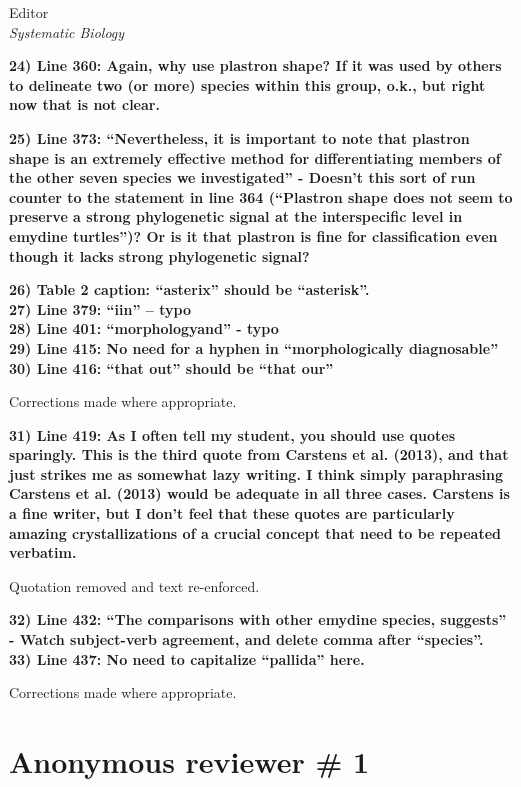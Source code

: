 \documentclass{letter}
\begin{document}
\begin{letter}{Editor \\ \textit{Systematic Biology}}

  \textbf{24) Line 360: Again, why use plastron shape? If it was used by others to delineate two (or more) species within this group, o.k., but right now that is not clear. }


  \textbf{25) Line 373: ``Nevertheless, it is important to note that plastron shape is an extremely effective method for differentiating members of the other seven species we investigated'' - Doesn’t this sort of run counter to the statement in line 364 (``Plastron shape does not seem to preserve a strong phylogenetic signal at the interspecific level in emydine turtles'')? Or is it that plastron is fine for classification even though it lacks strong phylogenetic signal? }


  \textbf{26) Table 2 caption: ``asterix'' should be ``asterisk''. \\
    27) Line 379: ``iin'' – typo \\
    28) Line 401: ``morphologyand'' - typo \\
    29) Line 415: No need for a hyphen in ``morphologically diagnosable''\\
  30) Line 416: ``that out'' should be ``that our'' }

  Corrections made where appropriate.

  \textbf{31) Line 419: As I often tell my student, you should use quotes sparingly. This is the third quote from Carstens et al. (2013), and that just strikes me as somewhat lazy writing. I think simply paraphrasing Carstens et al. (2013) would be adequate in all three cases. Carstens is a fine writer, but I don’t feel that these quotes are particularly amazing crystallizations of a crucial concept that need to be repeated verbatim. }

  Quotation removed and text re-enforced.

  \textbf{32) Line 432: ``The comparisons with other emydine species, suggests'' - Watch subject-verb agreement, and delete comma after “species”. \\
  33) Line 437: No need to capitalize ``pallida'' here. }

  Corrections made where appropriate.


  \section{Anonymous reviewer \# 1}


\end{letter}
\end{document}
